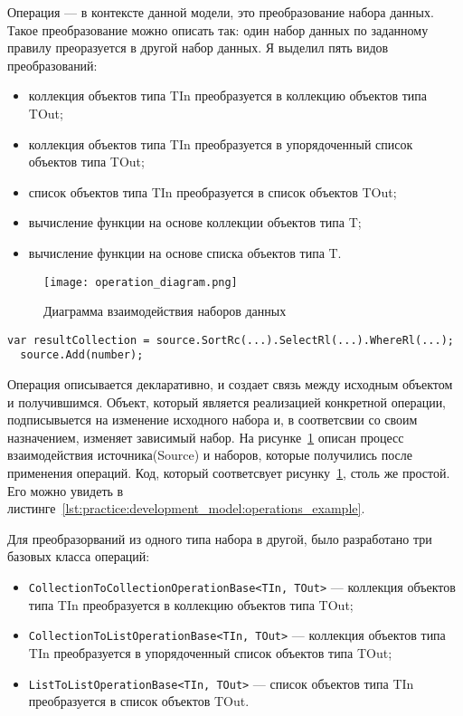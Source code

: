 Операция --- в контексте данной модели, это преобразование набора данных. Такое преобразование можно описать так: один набор данных по заданному правилу преоразуется в другой набор данных.
Я выделил пять видов преобразований:

\begin{itemize}
  \item коллекция объектов типа TIn преобразуется в коллекцию объектов типа TOut;
  \item коллекция объектов типа TIn преобразуется в упорядоченный список объектов типа TOut;
  \item список объектов типа TIn преобразуется в список объектов TOut;
  \item вычисление функции на основе коллекции объектов типа T;
  \item вычисление функции на основе списка объектов типа T.
\end{itemize}

\begin{figure}[ht]
\centering
  \texttt{[image: operation\_diagram.png]}
  \caption{ Диаграмма взаимодействия наборов данных }
  \label{fig:operation_diagram}
\end{figure}

\begin{lstlisting}[style=csharpinlinestyle, caption={Пример применения операций}, label=lst:practice:development_model:operations_example]
  var resultCollection = source.SortRc(...).SelectRl(...).WhereRl(...);
  source.Add(number);
\end{lstlisting}

Операция описывается декларативно, и создает связь между исходным объектом и получившимся. Объект, который является реализацией конкретной операции, подписывыется на изменение исходного набора и, в соответсвии
со своим назначением, изменяет зависимый набор. На рисунке~\ref{fig:operation_diagram} описан процесс взаимодействия источника(Source) и наборов, которые получились после применения операций.
Код, который соответсвует рисунку~\ref{fig:operation_diagram}, столь же простой. Его можно увидеть в листинге~\ref{lst:practice:development_model:operations_example}.

Для преобразорваний из одного типа набора в другой, было разработано три базовых класса операций:

\begin{itemize}
  \item \lstinline[style=csharpinlinestyle]!CollectionToCollectionOperationBase<TIn, TOut>! --- коллекция объектов типа TIn преобразуется в коллекцию объектов типа TOut;
  \item \lstinline[style=csharpinlinestyle]!CollectionToListOperationBase<TIn, TOut>! --- коллекция объектов типа TIn преобразуется в упорядоченный список объектов типа TOut;
  \item \lstinline[style=csharpinlinestyle]!ListToListOperationBase<TIn, TOut>! --- список объектов типа TIn преобразуется в список объектов TOut.
\end{itemize}

